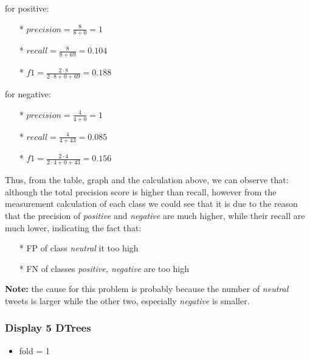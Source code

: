 \documentclass[11pt]{article}
\providecommand{\tightlist}{%
      \setlength{\itemsep}{0pt}\setlength{\parskip}{0pt}}
\begin{document}
\begin{itemize}
for positive:
\begin{itemize}
	\item[*] \(precision = \frac{8}{8 + 0} = 1\)
	\item[*] \(recall = \frac{8}{8 + 69} = 0.104\)
	\item[*] \(f1 = \frac{2 \cdot 8}{2 \cdot 8 + 0 + 69} = 0.188\)
\end{itemize}


for negative:
\begin{itemize}
	\item[*] \(precision = \frac{4}{4 + 0} = 1\)
	\item[*] \(recall = \frac{4}{4 + 43} = 0.085\)
	\item[*] \(f1 = \frac{2 \cdot 4}{2 \cdot 4 + 0 + 43} = 0.156\)
\end{itemize}\mbox{}

 
  Thus, from the table, graph and the calculation above, we can observe that:\\
  
   although the total precision
  	score is higher than recall, however from the measurement calculation of each class we could see that it is due to the reason that the precision of \textit{positive} and \textit{negative} are much higher, while their recall are much lower, indicating the fact that:
  	
  	\begin{itemize}
  		\item[*] FP of class \textit{neutral} it too high
  		\item[*] FN of classes \textit{positive, negative} are too high
  	\end{itemize}
  
  \textbf{Note:} the cause for this problem is probably because the number of \textit{neutral} tweets is larger while the other two, especially \textit{negative} is smaller.
\end{itemize}

\newpage

    \subsubsection*{Display 5 DTrees}\label{display-5-dtrees}

    \begin{itemize}
\tightlist
\item
  fold = 1
\end{itemize}
\end{document}
